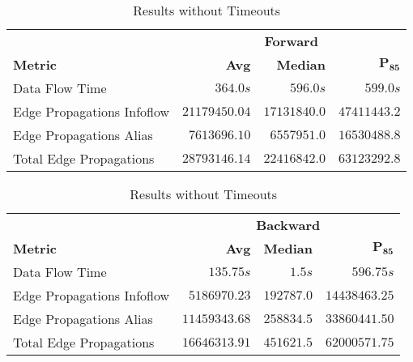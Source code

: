 \documentclass[../draft.tex]{subfiles}
\begin{document}
    \begin{table}[ht]
        \centering
        \begin{tabular}{l | r | r | r}
            & \multicolumn{3}{c}{\textbf{Forward}}\\
            \textbf{Metric} & \textbf{Avg} & \textbf{Median} & $\mathbf{P_{85}}$\\
            \hline\hline
            Data Flow Time & $364.0s$ & $596.0s$ & $599.0s$\\
            \hline
            Edge Propagations Infoflow & $21179450.04$ & $17131840.0$ & $47411443.2$\\
            Edge Propagations Alias & $7613696.10$ & $6557951.0$ & $16530488.8$\\
            Total Edge Propagations & $28793146.14$ & $22416842.0$ & $63123292.8$\\            
        \end{tabular}
        \bigbreak
        \begin{tabular}{l | r | r | r}
            & \multicolumn{3}{c}{\textbf{Backward}}\\
            \textbf{Metric} & \textbf{Avg} & \textbf{Median} & $\mathbf{P_{85}}$\\
            \hline\hline
            Data Flow Time & $135.75s$ & $1.5s$ & $596.75s$\\
            \hline
            Edge Propagations Infoflow & $5186970.23$ & $192787.0$ & $14438463.25$\\
            Edge Propagations Alias & $11459343.68$ & $258834.5$ & $33860441.50$\\
            Total Edge Propagations & $16646313.91$ & $451621.5$ & $62000571.75$\\
        \end{tabular}
        \caption{Results without Timeouts}
        \label{t:realworldresultswithouttimeout}
    \end{table}
\end{document}
